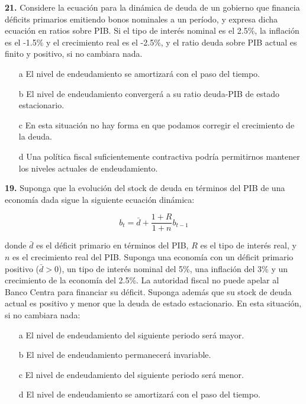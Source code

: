 \documentclass{nuevotema}
\begin{document}
\textbf{21.} Considere la ecuación para la dinámica de deuda de un gobierno que financia déficits primarios emitiendo bonos nominales a un período, y expresa dicha ecuación en ratios sobre PIB. Si el tipo de interés nominal es el 2.5\%, la inflación es el -1.5\% y el crecimiento real es el -2.5\%, y el ratio deuda sobre PIB actual es finito y positivo, si no cambiara nada. 

\begin{itemize}
	\item[a] El nivel de endeudamiento se amortizará con el paso del tiempo.
	\item[b] El nivel de endeudamiento convergerá a su ratio deuda-PIB de estado estacionario.
	\item[c] En esta situación no hay forma en que podamos corregir el crecimiento de la deuda.
	\item[d] Una política fiscal suficientemente contractiva podría permitirnos mantener los niveles actuales de endeudamiento.
\end{itemize}

\textbf{19.} Suponga que la evolución del stock de deuda en términos del PIB de una economía dada sigue la siguiente ecuación dinámica:

\begin{equation*}
b_t = \bar{d} + \frac{1+R}{1+n} b_{t-1}
\end{equation*}

donde $\bar{d}$ es el déficit primario en términos del PIB, $R$ es el tipo de interés real, y $n$ es el crecimiento real del PIB. Suponga una economía con un déficit primario positivo ($\bar{d} > 0$), un tipo de interés nominal del 5\%, una inflación del 3\% y un crecimiento de la economía del 2.5\%. La autoridad fiscal no puede apelar al Banco Centra para financiar su déficit. Suponga además que su stock de deuda actual es positivo y menor que la deuda de estado estacionario. En esta situación, si no cambiara nada:

\begin{itemize}
	\item[a] El nivel de endeudamiento del siguiente periodo será mayor.
	\item[b] El nivel de endeudamiento permanecerá invariable.
	\item[c] El nivel de endeudamiento del siguiente periodo será menor.
	\item[d] El nivel de endeudamiento se amortizará con el paso del tiempo.
\end{itemize}
\end{document}
